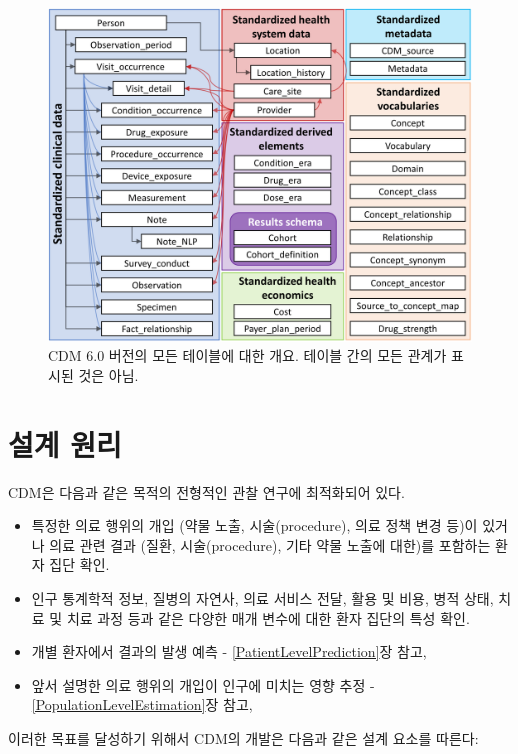 \documentclass[11pt]{book}
\providecommand{\tightlist}{%
  \setlength{\itemsep}{0pt}\setlength{\parskip}{0pt}}
\theoremstyle{definition}
\theoremstyle{definition}
\theoremstyle{definition}
\theoremstyle{remark}
\begin{document}
\begin{figure}
\includegraphics[width=1\linewidth]{images/CommonDataModel/cdmDiagram} \caption{CDM 6.0 버전의 모든 테이블에 대한 개요. 테이블 간의 모든 관계가 표시된 것은 아님.}\label{fig:cdmDiagram}
\end{figure}

\section{설계 원리}\label{-}

CDM은 다음과 같은 목적의 전형적인 관찰 연구에 최적화되어
있다.

\begin{itemize}
\tightlist
\item
  특정한 의료 행위의 개입 (약물 노출, 시술(procedure), 의료 정책 변경
  등)이 있거나 의료 관련 결과 (질환, 시술(procedure), 기타 약물 노출에
  대한)를 포함하는 환자 집단 확인.
\item
  인구 통계학적 정보, 질병의 자연사, 의료 서비스 전달, 활용 및 비용,
  병적 상태, 치료 및 치료 과정 등과 같은 다양한 매개 변수에 대한 환자
  집단의 특성 확인.
\item
  개별 환자에서 결과의 발생 예측 - \ref{PatientLevelPrediction}장 참고,
\item
  앞서 설명한 의료 행위의 개입이 인구에 미치는 영향 추정 -
  \ref{PopulationLevelEstimation}장 참고,
\end{itemize}

이러한 목표를 달성하기 위해서 CDM의 개발은 다음과 같은 설계 요소를
따른다:
\end{document}
